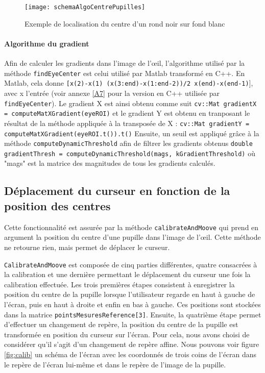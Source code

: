 \begin{figure}[H]
  \centering
  \texttt{[image: schemaAlgoCentrePupilles]}
  \caption{Exemple de localisation du centre d'un rond noir sur fond blanc \cite{timm2011accurate}}
  \label{fig:schemaAlgoCentrePupilles}
\end{figure}

\paragraph{Algorithme du gradient}

Afin de calculer les gradients dans l’image de l’œil, l’algorithme utilisé par la méthode \lstinline=findEyeCenter= est celui utilisé par Matlab transformé en C++. En Matlab, cela donne \lstinline=[x(2)-x(1) (x(3:end)-x(1:end-2))/2 x(end)-x(end-1)=], avec x l’entrée (voir annexe \ref{A7} pour la version en C++ utilisée par \lstinline=findEyeCenter=). Le gradient X est ainsi obtenu comme suit \lstinline-cv::Mat gradientX = computeMatXGradient(eyeROI)- et le gradient Y est obtenu en tranposant le résultat de la méthode appliquée à la transposée de X : \lstinline-cv::Mat gradientY = computeMatXGradient(eyeROI.t()).t()-
Ensuite, un seuil est appliqué grâce à la méthode \lstinline=computeDynamicThreshold= afin de filtrer les gradients obtenus \lstinline-double gradientThresh = computeDynamicThreshold(mags, kGradientThreshold)- où "mags" est la matrice des magnitudes de tous les gradients calculés.

\subsection{Déplacement du curseur en fonction de la position des centres}

Cette fonctionnalité est assurée par la méthode \lstinline=calibrateAndMoove=  qui prend en argument la position du centre d’une pupille dans l’image de l’œil. Cette méthode ne retourne rien, mais permet de déplacer le curseur.

\lstinline=CalibrateAndMoove= est composée de cinq parties différentes, quatre consacrées à la calibration et une dernière permettant le déplacement du curseur une fois la calibration effectuée. Les trois premières étapes consistent à enregistrer la position du centre de la pupille lorsque l’utilisateur regarde en haut à gauche de l’écran, puis en haut à droite et enfin en bas à gauche. Ces positions sont stockées dans la matrice \lstinline=pointsMesuresReference[3]=. Ensuite, la quatrième étape permet d’effectuer un changement de repère, la position du centre de la pupille est transformée en position du curseur sur l’écran. Pour cela, nous avons choisi de considérer qu’il s’agit d’un changement de repère affine. Nous pouvons voir figure \ref{fig:calib} un schéma de l’écran avec les coordonnés de trois coins de l’écran dans le repère de l’écran lui-même et dans le repère de l’image de la pupille.

